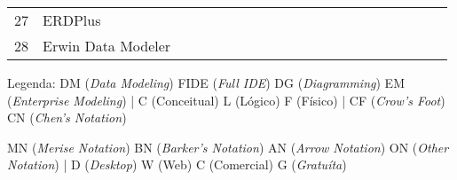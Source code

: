 \begin{landscape}
\begin{table}
\begin{tabular}{l|l|cccc|ccc|cccccccc|cc|cc}
27 & ERDPlus	&	\checkmark	&&&	&	\checkmark	&	\checkmark	&&	\checkmark	&&&&&&&	&&	\checkmark&&	\checkmark\\
28 & Erwin Data Modeler	&	\checkmark	&&&	&&	\checkmark	&	\checkmark	&	\checkmark	&	\checkmark	&&&&&&	&	\checkmark	&	&	\checkmark	&	\\
    \toprule
    \end{tabular}
    \begin{tablenotes}
    \tiny
    \item Legenda: DM (\textit{Data Modeling}) FIDE (\textit{Full IDE}) DG (\textit{Diagramming}) EM (\textit{Enterprise Modeling}) | 
    C (Conceitual) L (Lógico) F (Físico) | 
    CF (\textit{Crow's Foot}) CN (\textit{Chen's Notation}) 
    \item MN (\textit{Merise Notation}) BN (\textit{Barker's Notation}) AN (\textit{Arrow Notation}) ON (\textit{Other Notation}) | 
    D (\textit{Desktop}) W (Web) C (Comercial) G (\textit{Gratu\'ita})
    \end{tablenotes}
\end{table}
\end{landscape}


